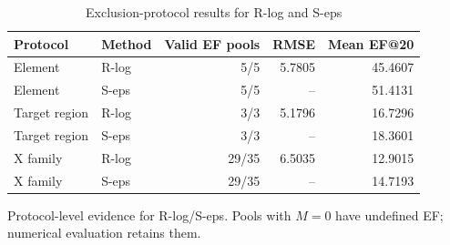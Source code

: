 \par
\begin{table}[H]
\centering
\begin{threeparttable}
\caption{Exclusion-protocol results for R-log and S-eps}\label{tab:stress}
\begin{tabularx}{\linewidth}{@{}X l r r r@{}}
\toprule
Protocol & Method & Valid EF pools & RMSE & Mean EF@20\\
\midrule
Element & R-log & 5/5 & 5.7805 & 45.4607\\
Element & S-eps & 5/5 & -- & 51.4131\\
Target region & R-log & 3/3 & 5.1796 & 16.7296\\
Target region & S-eps & 3/3 & -- & 18.3601\\
X family & R-log & 29/35 & 6.5035 & 12.9015\\
X family & S-eps & 29/35 & -- & 14.7193\\
\bottomrule
\end{tabularx}
\begin{tablenotes}[flushleft]
\item[] Protocol-level evidence for R-log/S-eps. Pools with $M=0$ have undefined EF; numerical evaluation retains them.
\end{tablenotes}
\end{threeparttable}
\end{table}
\par
